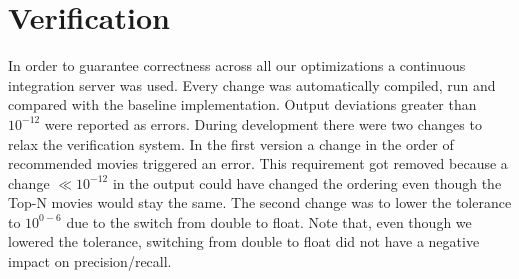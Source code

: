 \section{Verification}\label{sec:verification}
In order to guarantee correctness across all our optimizations a continuous integration server was used. Every change was automatically compiled, run and compared with the baseline implementation. Output deviations greater than $10^{-12}$ were reported as errors. During development there were two changes to relax the verification system. In the first version a change in the order of recommended movies triggered an error. This requirement got removed because a change $ \ll 10^{-12}$ in the output could have changed the ordering even though the Top-N movies would stay the same. The second change was to lower the tolerance to $10^{0-6}$ due to the switch from double to float. Note that, even though we lowered the tolerance, switching from double to float did not have a negative impact on precision/recall.